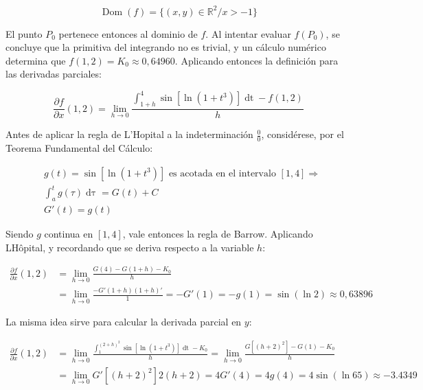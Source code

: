 \documentclass{article}
\renewcommand{\Bbb}{\mathbb}
\begin{document}
\begin{equation}
\mathop{Dom}(f) = \{ (x,y) \in \Bbb R^2 / x > -1 \}
\end{equation}

El punto $P_0$ pertenece entonces al dominio de $f$. Al intentar evaluar $f(P_0)$, se concluye que la primitiva del integrando no es trivial, y un cálculo numérico determina que $f(1,2) = K_0 \approx 0,64960$. Aplicando entonces la definición para las derivadas parciales:

\begin{equation}
\frac{\partial f}{\partial x}(1,2) = \lim_{h \rightarrow 0} \frac{ \int_{1+h}^4 \sin[ \ln(1 + t^3) ] \mathop{dt} - f(1,2) }{h} 
\end{equation}

Antes de aplicar la regla de L'Hopital a la indeterminación $\frac{0}{0}$, considérese, por el Teorema Fundamental del Cálculo:

\begin{subequations}
\begin{align}
& g(t) = \sin[ \ln(1 + t^3) ] \text{ es acotada en el intervalo } [1,4] \Rightarrow \\
& \int_a^t g(\tau) \mathop{d\tau} = G(t) + C \\
& G'(t) = g(t)
\end{align}
\end{subequations}

Siendo $g$ continua en $[1,4]$, vale entonces la regla de Barrow. Aplicando LHôpital, y recordando que se deriva respecto a la variable $h$:

\begin{subequations}
\begin{align}
\frac{\partial f}{\partial x}(1,2) &= \lim_{h \rightarrow 0} \frac{G(4) - G(1+h) - K_0}{h} & \\
&= \lim_{h \rightarrow 0} \frac{-G'(1+h) (1+h)'}{1} = -G'(1) = -g(1) = \sin( \ln 2 ) \approx 0,63896
\end{align}
\end{subequations}

La misma idea sirve para calcular la derivada parcial en $y$:

\begin{subequations}
\begin{align}
\frac{\partial f}{\partial x}(1,2) &= \lim_{h \rightarrow 0} \frac{ \int_{1}^{(2+h)^2} \sin[ \ln(1 + t^3) ] \mathop{dt} - K_0 }{h} = \lim_{h \rightarrow 0} \frac{G[(h+2)^2] - G(1) - K_0}{h} & \\
&= \lim_{h \rightarrow 0} G'[(h+2)^2] 2 (h+2) = 4 G'(4) = 4 g(4) = 4 \sin( \ln 65 ) \approx -3.4349
\end{align}
\end{subequations}
\end{document}
